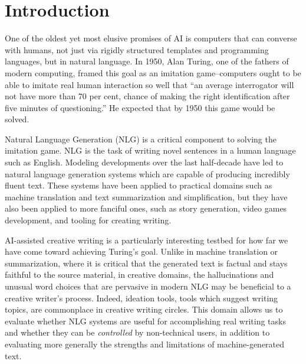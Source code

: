 \chapter{Introduction} \label{chap:intro}

One of the oldest yet most elusive promises of AI is computers that can converse with humans, not just via rigidly structured templates and programming languages, but in natural language.
In 1950, Alan Turing, one of the fathers of modern computing, framed this goal as an imitation game--computers ought to be able to imitate real human interaction so well that ``an average interrogator will not have more than 70 per cent, chance of making the right identification after five minutes of questioning.''
He expected that by 1950 this game would be solved.

Natural Language Generation (NLG) is a critical component to solving the imitation game.
NLG is the task of writing novel sentences in a human language such as English. 
Modeling developments over the last half-decade have led to natural language generation systems which are capable of producing incredibly fluent text.
These systems have been applied to practical domains such as machine translation and text summarization and simplification, but they have also been applied to more fanciful ones, such as story generation, video games development, and tooling for creating writing.

AI-assisted creative writing is a particularly interesting testbed for how far we have come toward achieving Turing's goal.
Unlike in machine translation or summarization, where it is critical that the generated text is factual and stays faithful to the source material, in creative domains, the hallucinations and unusual word choices that are pervasive in modern NLG may be beneficial to a creative writer's process.
Indeed, ideation tools, tools which suggest writing topics, are commonplace in creative writing circles.
This domain allows us to evaluate whether NLG systems are useful for accomplishing real writing tasks and whether they can be \textit{controlled} by non-technical users, in addition to evaluating more generally the strengths and limitations of machine-generated text. 


